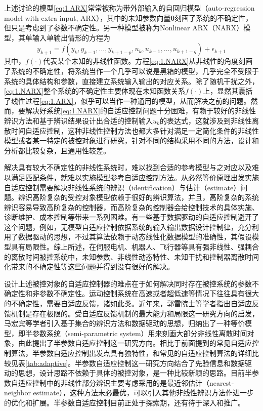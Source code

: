 上述讨论的模型\eqref{eq:1.ARX}常常被称为带外部输入的自回归模型（auto-regression model with extra input, ARX），其中的未知参数向量$\bm{\theta}$刻画了系统的不确定性，但只是考虑到了参数不确定性。另一种模型被称为Nonlinear ARX（NARX）模型，其单输入单输出情形的方程为
\begin{equation}%
\label{eq:1.NARX}
y_{k+1} = f(y_{k},y_{k-1},\ldots,y_{k+1-p},u_{k},u_{k-1},\ldots,u_{k+1-q})+\epsilon_{k+1}
\end{equation}
其中，$f(\cdot)$代表某个未知的非线性函数。方程\eqref{eq:1.NARX}从非线性的角度刻画了系统的不确定性，将系统当作一个几乎可以说是黑箱的模型，几乎完全不受限于系统的具体结构和参数，直接建立系统输入输出的对应关系。除了随机干扰之外，\eqref{eq:1.NARX}整个系统的不确定性主要体现在未知函数关系$f(\cdot)$上，显然其囊括了线性过程\eqref{eq:1.ARX}，似乎可以当作一种通用的模型，从而解决之前的问题。然而，要解决好系统\eqref{eq:1.NARX}的自适应控制问题十分困难，有赖于较好的非线性辨识方法和基于辨识结果设计出合适的控制输入$u_{k}$的表达式，这就涉及到非线性离散时间自适应控制，这种非线性控制方法也都大多针对满足一定简化条件的非线性模型或者某一特定的被控对象进行研究，针对不同的结构采用不同的方法，设计和分析都比较复杂，且通用性较差。

解决具有较大不确定性的非线性系统时，难以找到合适的参考模型与之对应以及难以满足匹配条件，就难以实施模型参考自适应控制方法。从必然等价原理出发实施自适应控制需要解决非线性系统的辨识（identification）与估计（estimate）问题。辨识高阶复杂的受控对象模型依赖于很好的辨识算法，并且，高阶复杂的系统辨识容易导致高阶复杂的控制器，而高阶复杂的控制器会给控制技术的具体实施、诊断维护、成本控制等带来一系列困难。有一些基于数据驱动的自适应控制避开了这个问题，例如，无模型自适应控制依据系统的输入输出数据设计控制律，充分利用了数据驱动的思想，不过其算法依赖于动态线性化数据模型的准确性，其假设模型具有局限性。综上所述，在伺服电机、机器人、飞行器等具有强非线性、强耦合的离散时间被控系统中，未知参数、非线性动态特性、未知干扰和控制器离散时间化带来的不确定性等这些问题并得到没有很好的解决。

设计上述被控对象的自适应控制器的难点在于如何解决同时存在被控系统的参数不确定性和非参数不确定性。运动控制系统在高速或者超低速等情况下往往具有很大的不确定性，需要自适应反馈，诸如此类。近年来，郭雷院士等学者指出自适应反馈机制是存在极限的。受自适应反馈机制的最大能力和局限这一研究方向的启发，马宏宾等学者引入基于集合的辨识方法和数据驱动的思想，归纳出了一种等价模型，即半参数系统（semi-parametric system）用来刻画大部分非线性离散时间对象，由此提出了半参数自适应控制这一研究方向。相比于前面提到的常见自适应控制算法，半参数自适应控制出发点具有独特性，和常见的自适应控制算法的详细比较见表\eqref{tab:adaptive}。半参数自适应控制这一研究方向结合了先验信息和数据驱动的思想，设计思路不依赖于具体的被控对象，是一种比较新颖的思路。目前半参数自适应控制中的非线性部分辨识主要考虑采用的是最近邻估计（nearest-neighbor estimate），这种方法未必最优，可以引入其他非线性辨识方法作进一步的优化和扩展。半参数自适应控制目前正处于探索期，还有待于深入和推广。

